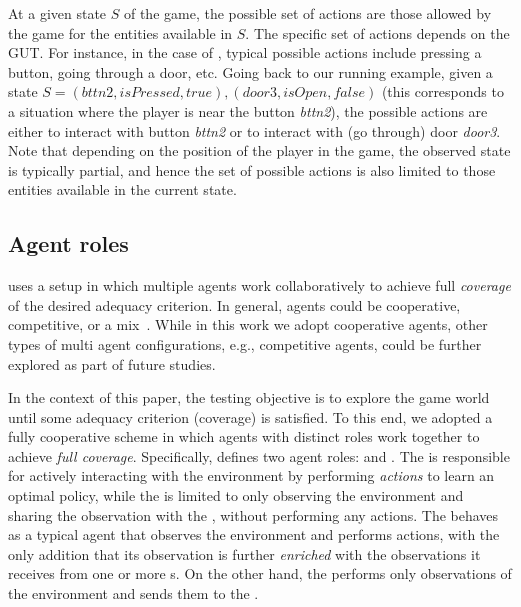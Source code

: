 At a given state $S$ of the game, the possible set of actions are those allowed by the game for the entities available in $S$. The specific set of actions depends on the GUT. For instance, in the case of \sut, typical possible actions include pressing a button, going through a door, etc. Going back to our running example, given a state $S = (bttn2, isPressed, true), (door3, isOpen, false)$ (this corresponds to a situation where the player is near the button \emph{bttn2}), the possible actions are either to interact with button \emph{bttn2} or to interact with (go through) door \emph{door3}. Note that depending on the position of the player in the game, the observed state is typically partial, and hence the set of possible actions is also limited to those entities available in the current state.

\subsection{Agent roles}
\approach uses a \marlacronym setup in which multiple agents work collaboratively to achieve full \emph{coverage} of the desired adequacy criterion. 
In general, \marlacronym agents could be cooperative, competitive, or a mix~\cite{DBLP:journals/tsmc/BusoniuBS08}. While in this work we adopt cooperative agents, other types of multi agent configurations, e.g., competitive agents, could be further explored as part of future studies. 

In the context of this paper, the testing objective is to explore the game world until some adequacy criterion (coverage) is satisfied. To this end, we adopted a fully cooperative \marlacronym scheme in which agents with distinct roles work together to achieve \emph{full coverage}.  Specifically, \approach defines two agent roles: \aagent and \pagent. The \aagent is responsible for actively interacting with the environment by performing \emph{actions} to learn an optimal policy, while the \pagent is limited to only observing the environment and sharing the observation with the \aagent, without performing any actions. The \aagent behaves as a typical \rlacronym agent that observes the environment and performs actions, with the only addition that its observation is further \emph{enriched} with the observations it receives from one or more {\pagent}s. On the other hand, the \pagent performs only observations of the environment and sends them to the \aagent. 

